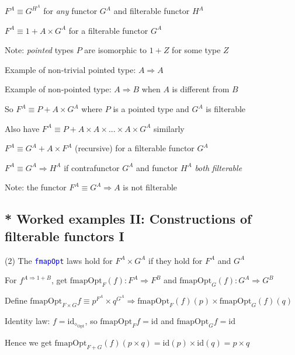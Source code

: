 $F^{A}\equiv G^{H^{A}}$ for \emph{any} functor $G^{A}$ and filterable
functor $H^{A}$

$F^{A}\equiv1+A\times G^{A}$ for a filterable functor $G^{A}$

Note: \emph{pointed} types $P$ are isomorphic to $1+Z$ for some
type $Z$

Example of non-trivial pointed type: $A\Rightarrow A$

Example of non-pointed type: $A\Rightarrow B$ when $A$ is different
from $B$

So $F^{A}\equiv P+A\times G^{A}$ where $P$ is a pointed type and
$G^{A}$ is filterable

Also have $F^{A}\equiv P+A\times A\times...\times A\times G^{A}$
similarly

$F^{A}\equiv G^{A}+A\times F^{A}$ (recursive) for a filterable functor
$G^{A}$

$F^{A}\equiv G^{A}\Rightarrow H^{A}$ if\emph{ }contrafunctor $G^{A}$
and functor $H^{A}$ \emph{both} \emph{filterable}

Note: the functor $F^{A}\equiv G^{A}\Rightarrow A$ is not filterable


\subsection{{*} Worked examples II: Constructions of filterable functors I}

(2) The \texttt{\textcolor{blue}{\footnotesize{}fmapOpt}} laws hold
for $F^{A}\times G^{A}$ if they hold for $F^{A}$ and $G^{A}$

For $f^{A\Rightarrow1+B}$, get {\footnotesize{}$\text{fmapOpt}_{F}(f):F^{A}\Rightarrow F^{B}$
}and {\footnotesize{}$\text{fmapOpt}_{G}(f):G^{A}\Rightarrow G^{B}$}{\footnotesize\par}

Define {\footnotesize{}$\text{fmapOpt}_{F\times G}f\equiv p^{F^{A}}\times q^{G^{A}}\Rightarrow\text{fmapOpt}_{F}(f)(p)\times\text{fmapOpt}_{G}(f)(q)$}{\footnotesize\par}

Identity law: $f=\text{id}_{\diamond_{\text{Opt}}}$, so {\footnotesize{}$\text{fmapOpt}_{F}f=\text{id}$}
and {\footnotesize{}$\text{fmapOpt}_{G}f=\text{id}$}{\footnotesize\par}

Hence we get $\text{fmapOpt}_{F+G}(f)(p\times q)=\text{id}(p)\times\text{id}(q)=p\times q$

